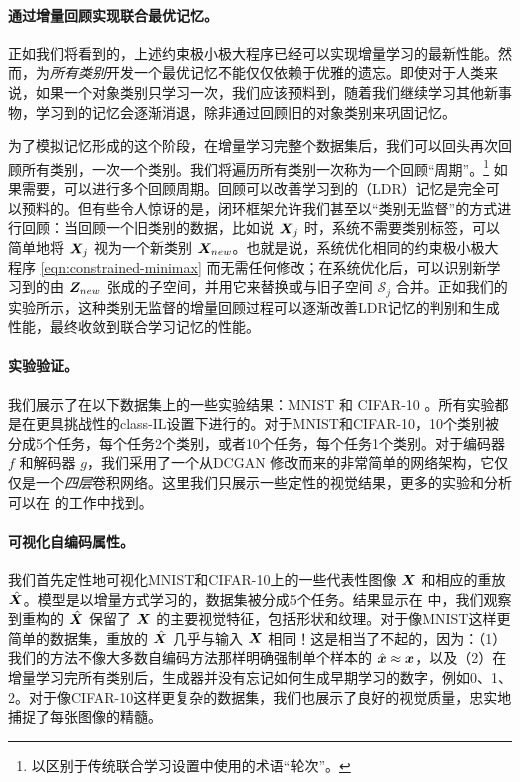 \documentclass[../../book-main_zh.tex]{subfiles}
\begin{document}
\paragraph{通过增量回顾实现联合最优记忆。} 
正如我们将看到的，上述约束极小极大程序已经可以实现增量学习的最新性能。然而，为{\em 所有类别}开发一个最优记忆不能仅仅依赖于优雅的遗忘。即使对于人类来说，如果一个对象类别只学习一次，我们应该预料到，随着我们继续学习其他新事物，学习到的记忆会逐渐消退，除非通过回顾旧的对象类别来巩固记忆。

为了模拟记忆形成的这个阶段，在增量学习完整个数据集后，我们可以回头再次回顾所有类别，一次一个类别。我们将遍历所有类别一次称为一个回顾“周期”。\footnote{以区别于传统联合学习设置中使用的术语“轮次”。} 如果需要，可以进行多个回顾周期。回顾可以改善学习到的（LDR）记忆是完全可以预料的。但有些令人惊讶的是，闭环框架允许我们甚至以“{类别无监督}”的方式进行回顾：当回顾一个旧类别的数据，比如说 $\bm{X}_j$ 时，系统不需要类别标签，可以简单地将 $\bm{X}_j$ 视为一个新类别 $\bm{X}_{new}$。也就是说，系统优化相同的约束极小极大程序 \eqref{eqn:constrained-minimax} 而无需任何修改；在系统优化后，可以识别新学习到的由 $\bm{Z}_{new}$ 张成的子空间，并用它来替换或与旧子空间 $\mathcal{S}_j$ 合并。正如我们的实验所示，这种类别无监督的增量回顾过程可以逐渐改善LDR记忆的判别和生成性能，最终收敛到联合学习记忆的性能。

\paragraph{实验验证。}
我们展示了在以下数据集上的一些实验结果：MNIST \cite{lecun1998gradient} 和 CIFAR-10 \cite{krizhevsky2014cifar}。所有实验都是在更具挑战性的class-IL设置下进行的。对于MNIST和CIFAR-10，10个类别被分成5个任务，每个任务2个类别，或者10个任务，每个任务1个类别。对于编码器 $f$ 和解码器 $g$，我们采用了一个从DCGAN \cite{radford2016unsupervised} 修改而来的非常简单的网络架构，它仅仅是一个{\em 四层}卷积网络。这里我们只展示一些定性的视觉结果，更多的实验和分析可以在 \cite{tong2023incremental} 的工作中找到。

\paragraph{可视化自编码属性。}
我们首先定性地可视化MNIST和CIFAR-10上的一些代表性图像 $\bm{X}$ 和相应的重放 $\hat{\bm{X}}$。模型是以增量方式学习的，数据集被分成5个任务。结果显示在  中，我们观察到重构的 $\hat{\bm{X}}$ 保留了 $\bm{X}$ 的主要视觉特征，包括形状和纹理。对于像MNIST这样更简单的数据集，重放的 $\hat{\bm{X}}$ 几乎与输入 $\bm{X}$ 相同！这是相当了不起的，因为：（1）我们的方法不像大多数自编码方法那样明确强制单个样本的 $\hat{\bm{x}} \approx \bm{x}$，以及（2）在增量学习完所有类别后，生成器并没有忘记如何生成早期学习的数字，例如0、1、2。对于像CIFAR-10这样更复杂的数据集，我们也展示了良好的视觉质量，忠实地捕捉了每张图像的精髓。
\end{document}
